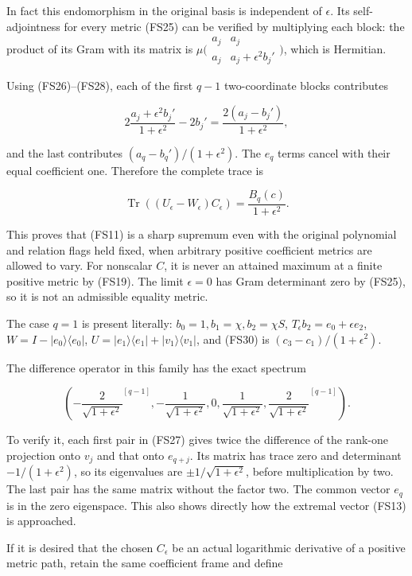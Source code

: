 In fact this endomorphism in the original basis is independent of \(\epsilon\). Its self-adjointness for every metric (FS25) can be verified by multiplying each block: the product of its Gram with its matrix is \(\mu\bigl(\begin{smallmatrix}a_j&a_j\\a_j&a_j+\epsilon^2 b_j'\end{smallmatrix}\bigr)\), which is Hermitian.

Using (FS26)--(FS28), each of the first \(q-1\) two-coordinate blocks contributes

\[
2\frac{a_j+\epsilon^2b_j'}{1+\epsilon^2}-2b_j'
=\frac{2(a_j-b_j')}{1+\epsilon^2},
\]

and the last contributes \((a_q-b_q')/(1+\epsilon^2)\). The \(e_q\) terms cancel with their equal coefficient one. Therefore the complete trace is

\[
\boxed{
\operatorname{Tr}((U_\epsilon-W_\epsilon)C_\epsilon)
=\frac{B_q(c)}{1+\epsilon^2}.
}
\tag{FS30}
\]

This proves that (FS11) is a sharp supremum even with the original polynomial and relation flags held fixed, when arbitrary positive coefficient metrics are allowed to vary. For nonscalar \(C\), it is never an attained maximum at a finite positive metric by (FS19). The limit \(\epsilon=0\) has Gram determinant zero by (FS25), so it is not an admissible equality metric.

The case \(q=1\) is present literally: \(b_0=1,b_1=\chi,b_2=\chi S\), \(T_\epsilon b_2=e_0+\epsilon e_2\), \(W=I-|e_0\rangle\langle e_0|\), \(U=|e_1\rangle\langle e_1|+|v_1\rangle\langle v_1|\), and (FS30) is \((c_3-c_1)/(1+\epsilon^2)\).

The difference operator in this family has the exact spectrum

\[
\left(
-\frac2{\sqrt{1+\epsilon^2}}^{[q-1]},
-\frac1{\sqrt{1+\epsilon^2}},0,
\frac1{\sqrt{1+\epsilon^2}},
\frac2{\sqrt{1+\epsilon^2}}^{[q-1]}
\right).
\tag{FS31}
\]

To verify it, each first pair in (FS27) gives twice the difference of the rank-one projection onto \(v_j\) and that onto \(e_{q+j}\). Its matrix has trace zero and determinant \(-1/(1+\epsilon^2)\), so its eigenvalues are \(\pm1/\sqrt{1+\epsilon^2}\), before multiplication by two. The last pair has the same matrix without the factor two. The common vector \(e_q\) is in the zero eigenspace. This also shows directly how the extremal vector (FS13) is approached.

If it is desired that the chosen \(C_\epsilon\) be an actual logarithmic derivative of a positive metric path, retain the same coefficient frame and define


